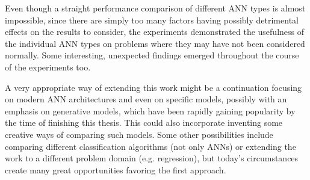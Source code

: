 Even though a straight performance comparison of different ANN types is almost impossible, since there are simply
too many factors having possibly detrimental effects on the results to consider, the experiments demonstrated
the usefulness of the individual ANN types on problems where they may have not been considered normally.
Some interesting, unexpected findings emerged throughout the course of the experiments too.

A very appropriate way of extending this work might be a continuation focusing on modern ANN architectures
and even on specific models, possibly with an emphasis on generative models, which have been rapidly gaining popularity
by the time of finishing this thesis. This could also incorporate inventing some creative ways of comparing
such models.
Some other possibilities include comparing different classification algorithms (not only ANNs) or extending
the work to a different problem domain (e.g. regression), but today's circumstances create many great opportunities
favoring the first approach.











